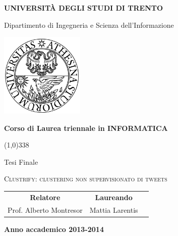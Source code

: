 \begin{titlepage}
  \pagestyle{empty}

  \begin{center}
    {\bfseries
      \Large {\huge U}NIVERSITÀ DEGLI STUDI DI {\huge T}RENTO}

    \vspace{0.2cm}

    {\Large Dipartimento di Ingegneria e Scienza dell'Informazione}

    \vspace{0.5cm}

    \begin{center}
      \includegraphics[width=0.3\textwidth]{img/logo_unitn.png}
    \end{center}

    \vspace{0.5cm}

    {\bfseries \Large Corso di Laurea triennale in INFORMATICA}

    \vspace{0.3cm}
    \line(1,0){338}
    \vspace{0.3cm}

    {\Large Tesi Finale}

    \vspace{2.5cm}

    {\huge \textsc{Clustrify: clustering non supervisionato di tweets}\\}

    \vspace{3.0cm}


    \large
    \begin{center}
      \begin{tabular}{ccc}
        {\bfseries Relatore} &
        \hspace{5cm}
        {\bfseries Laureando} \\

        Prof. Alberto Montresor &
        \hspace{5cm} Mattia Larentis \\


      \end{tabular}
    \end{center}
    \vspace{2.5cm}

    {\bfseries Anno accademico 2013-2014}
    \vfill
  \end{center}
\end{titlepage}